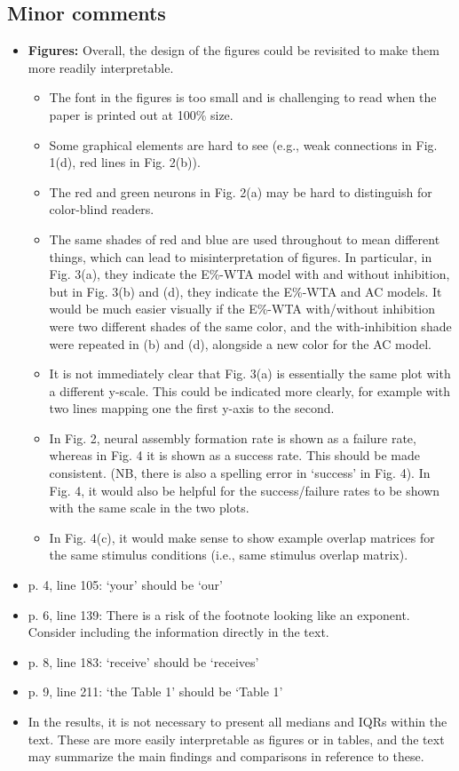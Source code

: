 \documentclass[a4paper, 11pt]{article}
\begin{document}
\subsection*{Minor comments}

\begin{itemize}
    \item \textbf{Figures:} Overall, the design of the figures could be revisited to make them more readily interpretable.
    \begin{itemize}
        \item The font in the figures is too small and is challenging to read when the paper is printed out at 100\% size.
        \item Some graphical elements are hard to see (e.g., weak connections in Fig. 1(d), red lines in Fig. 2(b)).
        \item The red and green neurons in Fig. 2(a) may be hard to distinguish for color-blind readers.
        \item The same shades of red and blue are used throughout to mean different things, which can lead to misinterpretation of figures. In particular, in Fig. 3(a), they indicate the E\%-WTA model with and without inhibition, but in Fig. 3(b) and (d), they indicate the E\%-WTA and AC models. It would be much easier visually if the E\%-WTA with/without inhibition were two different shades of the same color, and the with-inhibition shade were repeated in (b) and (d), alongside a new color for the AC model.
        \item It is not immediately clear that Fig. 3(a) is essentially the same plot with a different y-scale. This could be indicated more clearly, for example with two lines mapping one the first y-axis to the second.
        \item In Fig. 2, neural assembly formation rate is shown as a failure rate, whereas in Fig. 4 it is shown as a success rate. This should be made consistent. (NB, there is also a spelling error in `success' in Fig. 4). In Fig. 4, it would also be helpful for the success/failure rates to be shown with the same scale in the two plots.
        \item In Fig. 4(c), it would make sense to show example overlap matrices for the same stimulus conditions (i.e., same stimulus overlap matrix).
    \end{itemize}
    \item p. 4, line 105: `your' should be `our'
    \item p. 6, line 139: There is a risk of the footnote looking like an exponent. Consider including the information directly in the text.
    \item p. 8, line 183: `receive' should be `receives'
    \item p. 9, line 211: `the Table 1' should be `Table 1'
    \item In the results, it is not necessary to present all medians and IQRs within the text. These are more easily interpretable as figures or in tables, and the text may summarize the main findings and comparisons in reference to these.
\end{itemize}
\end{document}
